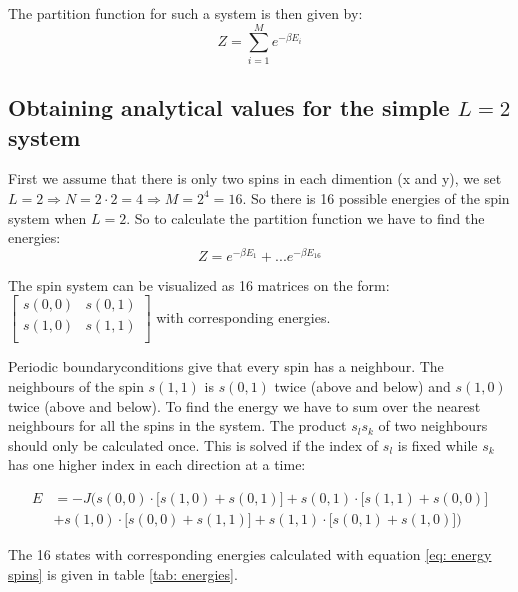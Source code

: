 \documentclass[11pt,a4wide]{article}
\begin{document}
The partition function for such a system is then given by:
\[
Z = \sum_{i=1}^M e^{-\beta E_i}
\]

\subsection{Obtaining analytical values for the simple $L=2$ system}
First we assume that there is only two spins in each dimention (x and y), we set $L=2 \Rightarrow N = 2\cdot 2 = 4\Rightarrow M= 2^4 = 16$. So there is 16 possible energies of the spin system when $L=2$. So to calculate the partition function we have to find the energies:
\[
Z = e^{-\beta E_1} + ... e^{-\beta E_{16}}
\]

The spin system can be visualized as 16 matrices on the form:
$\left[ \begin{array}{cc} s(0,0) & s(0,1) \\
                             	    s(1,0)  & s(1,1) \\
\end{array} \right]$
with corresponding energies. 

Periodic boundaryconditions give that every spin has a neighbour. The neighbours of the spin $s(1,1)$ is  $s(0,1)$ twice (above and below) and $s(1,0)$ twice (above and below). To find the energy we have to sum over the nearest neighbours for all the spins in the system. The product $s_ls_k$ of two neighbours should only be calculated once. This is solved if the index of $s_l$ is fixed while $s_k$ has one higher index in each direction at a time:

\begin{align}
E &= -J\bigg( s(0,0)\cdot \big[s(1,0) + s(0,1) \big] + s(0,1)\cdot\big[s(1,1) + s(0,0) \big] \nonumber   \\ 
 &+ s(1,0)\cdot\big[s(0,0) + s(1,1) \big] + s(1,1)\cdot\big[s(0,1) + s(1,0) \big] \bigg)
 \label{eq: energy spins}
\end{align}

The 16 states with corresponding energies calculated with equation \ref{eq: energy spins} is given in table \ref{tab: energies}.
\end{document}
